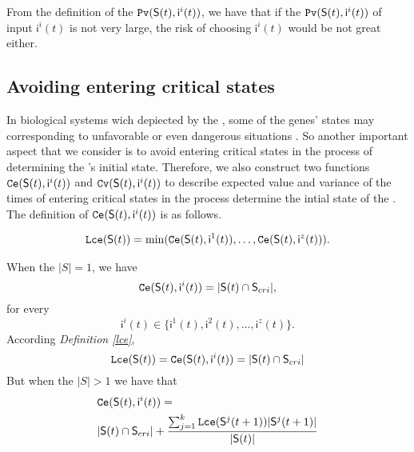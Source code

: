 From the definition of the ${\tt Pv}(\mathsf{S}(t), \mathsf{ i}^{i}(t))$, we have that if the ${\tt Pv}(\mathsf{S}(t), \mathsf{ i}^{i}(t))$ of input $\mathsf{ i}^{i}(t)$ is not very large, the risk of choosing $\mathsf{ i}^{i}(t)$ would be not great either.
\subsection{Avoiding entering critical states}
In biological systems wich depiected by the \BCNs, some of the genes' states may corresponding to unfavorable or even dangerous situations \cite{Li2014Controllability}. So another important aspect that we consider is to avoid entering critical states in the process of determining the \BCN's initial state. Therefore, we also construct two functions ${\tt Ce}(\mathsf{S}(t), \mathsf{ i}^{i}(t))$ and ${\tt Cv}(\mathsf{S}(t), \mathsf{ i}^{i}(t))$ to describe expected value and variance of the times of entering critical states in the process determine the intial state of the \BCNs. The definition of ${\tt Ce}(\mathsf{S}(t), \mathsf{ i}^{i}(t))$ is as follows.\\
\begin{definition}[$\Lce(S)$] \label{lce}
\begin{equation}
\begin{split}
{\tt Lce}(\mathsf{S}(t))= \min({\tt Ce}(\mathsf{S}(t), \mathsf{ i}^{1}(t)),\ldots,{\tt Ce}(\mathsf{S}(t), \mathsf{ i}^{z}(t))).
\end{split}
\end{equation}
\end{definition}
\begin{definition} 
When the $|S|=1$, we have \[{\tt Ce}(\mathsf{S}(t), \mathsf{ i}^{i}(t))=|\mathsf{S}(t) \cap \mathsf{S}_{cri} |,\]  for every \[\mathsf{ i}^{i}(t) \in \{\mathsf{ i}^{1}(t),\mathsf{ i}^{2}(t),\ldots, \mathsf{ i}^{z}(t)\}.\]  
According {\em Definition \ref{lce}}, %
\[{\tt Lce}(\mathsf{S}(t))={\tt Ce}(\mathsf{S}(t), \mathsf{ i}^{i}(t))=|\mathsf{S}(t) \cap \mathsf{S}_{cri} |\] 
But when the $|S|>1$ 
we have that 
\begin{equation}
\begin{split}
&{\tt Ce}(\mathsf{S}(t), \mathsf{ i}^{i}(t))=\\
&|\mathsf{S}(t) \cap \mathsf{S}_{cri}| +\frac{\sum_{j=1}^k {\tt Lce}(\mathsf{S}^{j}(t+1))|\mathsf{S}^{j}(t+1)|}{ |\mathsf{S}(t)|} 
\end{split}
\end{equation}
\end{definition}

